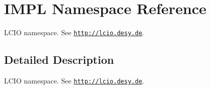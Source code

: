 \hypertarget{namespace_i_m_p_l}{}\section{I\+M\+PL Namespace Reference}
\label{namespace_i_m_p_l}


L\+C\+IO namespace. See \href{http://lcio.desy.de}{\tt http\+://lcio.\+desy.\+de}.  




\subsection{Detailed Description}
L\+C\+IO namespace. See \href{http://lcio.desy.de}{\tt http\+://lcio.\+desy.\+de}. 